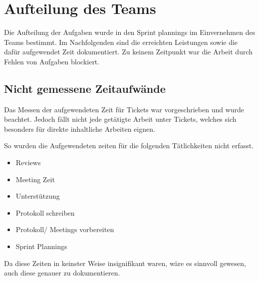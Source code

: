 \newcommand{\trWork}[6]
{
    \multicolumn{1}{|l|}{\textbf{\begin{tabular}[c]{@{}l@{}}#1\end{tabular}}} &
    \multicolumn{1}{l|}{\begin{tabular}[c]{@{}l@{}}#2\end{tabular}} &
    \multicolumn{1}{l|}{#3} &
    \\ \cline{1-3}
    \begin{tabular}[c]{@{}l@{}}#4\end{tabular} &
    \multicolumn{2}{l}{\begin{tabular}[c]{@{}l@{}}#5\end{tabular}} &
    \multirow{\begin{tabular}[c]{@{}l@{}}#6\end{tabular}} \\ \hline
}
\newcommand{\gitIssue}[1]
{
    \href{https://github.com/MaxTrautwein/AStA-Digital-Forms/issues/#1}{Issue #1}
}
\newcommand{\gitPull}[1]
{
    \href{https://github.com/MaxTrautwein/AStA-Digital-Forms/pull/#1}{PR #1}
}
\newcommand{\gitCommit}[2]
{
    \href{https://github.com/MaxTrautwein/AStA-Digital-Forms/pull/#1/commits/#2}{\StrLeft{#2}{10}}
}

\chapter{Aufteilung des Teams}\label{ch:aufteilung-des-teams}
Die Aufteilung der Aufgaben wurde in den Sprint plannings im Einvernehmen des Teams bestimmt.
Im Nachfolgenden sind die erreichten Leistungen sowie die dafür aufgewendet Zeit dokumentiert.
Zu keinem Zeitpunkt war die Arbeit durch Fehlen von Aufgaben blockiert.

\section{Nicht gemessene Zeitaufwände}\label{sec:nicht-gemessene-zeitaufwande}
Das Messen der aufgewendeten Zeit für Tickets war vorgeschrieben und wurde beachtet.
Jedoch fällt nicht jede getätigte Arbeit unter Tickets, welches sich besonders für direkte inhaltliche Arbeiten eignen.

So wurden die Aufgewendeten zeiten für die folgenden Tätlichkeiten nicht erfasst.
\begin{itemize}
    \item Reviews
    \item Meeting Zeit
    \item Unterstützung
    \item Protokoll schreiben
    \item Protokoll/ Meetings vorbereiten
    \item Sprint Plannings
\end{itemize}
Da diese Zeiten in keinster Weise insignifikant waren, wäre es sinnvoll gewesen, auch diese genauer zu dokumentieren.

